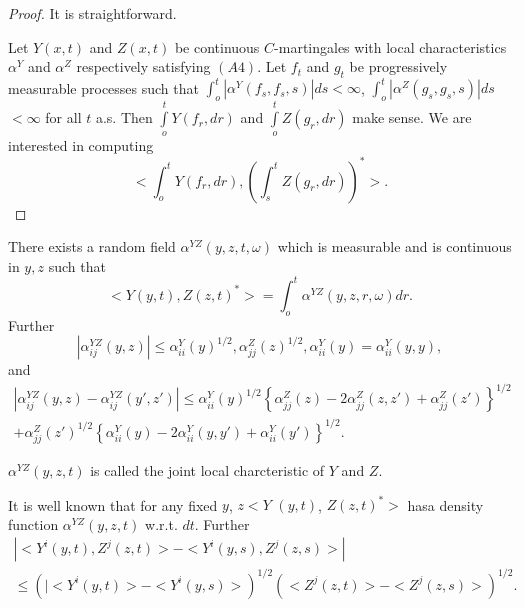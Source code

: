  \begin{proof} 
It is straightforward. 

   Let $Y(x,t)$ and $Z(x,t)$ be continuous $C$-martingales with local
   characteristics $\alpha^Y$ and $\alpha^Z$ respectively satisfying
   $(A4)$. Let $f_t$ and $g_t$ be progressively measurable processes
   such that $\int^t_o| \alpha^Y(f_s,f_s,s)|ds < \infty$,
   $\int^t_o|\alpha^Z(g_s,g_s,s)|ds$ $< \infty$ for all $t$ a.s. Then
   $\int\limits^t_o Y (f_r, dr)$ and $\int\limits^t_o Z (g_r, dr)$
   make sense. We are interested in computing 
   $$< \int^t_o
   Y(f_r,dr),(\int^t_s Z(g_r,dr))^*>.$$ 
 \end{proof} 


\setcounter{Lemma}{1}
 \begin{Lemma}\label{c2:lem2.3.2}%
   There exists a random field $\alpha^{YZ}(y, z, t, \omega)$ which is
   measurable and is continuous in $y,z$ such that 
   \begin{equation*} 
     <Y(y,t),Z(z,t)^* > = \int^t_o 
\alpha^{YZ}(y,z,r,\omega)dr. \tag{2.3.7}\label{c2:eq2.3.7}
   \end{equation*}
   Further
   \begin{equation*}
     |\alpha^{YZ}_{ij}(y,z)|\leq
     \alpha^Y_{ii}(y)^{1/2},\alpha^Z_{jj} (z)^{1/2}, \alpha^Y_{ii}(y)=
     \alpha^Y_{ii}(y,y), \tag{2.3.8}\label{c2:eq2.3.8} 
   \end{equation*}
   and
   \begin{multline*}
     |\alpha^{YZ}_{ij}(y,z)-\alpha^{YZ}_{ij}(y',z')|\leq 
     \alpha^Y_{ii}(y)^{1/2}\left\{\alpha^Z_{jj}(z)-2
     \alpha^Z_{jj}(z,z')+\alpha^Z_{jj}(z')\right\}^{1/2}\\ 
     +  \alpha^Z_{jj}(z')^{1/2}\left\{\alpha^Y_{ii}(y)-2
     \alpha^Y_{ii}(y,y')+\alpha^Y_{ii}(y')\right\}^{1/2}.\tag{2.3.9}\label{c2:eq2.3.9} 
   \end{multline*}
 \end{Lemma}
 
\setcounter{definition}{2}
 \begin{definition}%
   $\alpha^{YZ}(y,z,t)$ is called the joint local charcteristic of $Y$
   and $Z$. 
 \end{definition}

\setcounter{proofofsublemma}{1}
\begin{proofofsublemma}\label{c2:prflem2.3.2}%
  It is well known that for any fixed $y$, $z < Y$ $(y, t)$,
  $Z(z,t)^*>$ has\pageoriginale a 
  density function $\alpha^{YZ}(y,z,t)$ w.r.t. $dt$. Further 
  \begin{multline*}
    |<Y^i(y,t),Z^j(z,t)>-<Y^i(y,s),Z^j(z,s) >|\\
    \leq(|<Y^i(y,t)>-<Y^i(y,s)>)^{1/2}(<Z^j(z,t) >-<Z^j(z,s)>)^{1/2}.
  \end{multline*}
\end{proofofsublemma}

